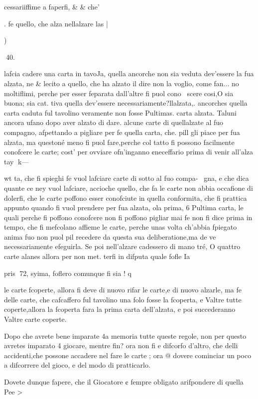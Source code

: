 \documentclass[11pt,a6paper]{article}
\begin{document}
 

cessariiffime a faperfi, & & che’

. fe quello, che alza nellalzare
las |

)

 
40.

lafcia cadere una carta in tavoJa, quella ancorche non sia veduta dev’essere la fua alzata, ne
& lecito a quello, che ha alzato
il dire non la voglio, come fan...
no moltiflimi, perche per esser
feparata dall’altre fi puol cono~
scere cosi,O sia buona; sia cat.
tiva quella dev’essere necessariamente?llalzata,. ancorches
quella carta caduta ful tavolino
veramente non fosse Pultimas.
carta alzata. Taluni ancora
ufano dopo aver alzato di dare.
alcune carte di quellalzate al
fuo compagno, afpettando a pigliare per fe quella carta, che.
pill gli piace per fua alzata, ma
questoné meno fi puol fare,perche col tatto fi possono facilmente conofcere le carte; cost’
per ovviare ofn’inganno ¢neceffario prima di venir all’alza
tay
k—

wt
ta, che fi spieghi fe vuol lafciare carte di sotto al fuo compa-~
gna, e che dica quante ce ney
vuol lafciare, accioche quello,
che fa le carte non abbia occafione di dolerfi, che le carte
poffono esser conofciute in quella conformita, che fi prattica
appunto quando fi vuol prendere per fua alzata, ola prima, 6
Pultima carta, le quali perche fi
poffono conofcere non fi poffono pigliar mai fe non fi dice prima in tempo, che fi mefcolano
affieme le carte, perche unas
volta ch’abbia fpiegato anima
fuo non puol pil recedere da
questa sua deliberatione,ma de
ve necessariamente efeguirla.
Se poi nell’alzare cadessero
di mano tré, O quattro carte
alanes allora per non met.
terfi in difputa quale fofle Ia

pris
72,
syima, foflero comunque fi sia
! q

le carte fcoperte, allora fi deve
di nuovo rifar le carte,e di nuovo alzarle, ma fe delle carte,
che cafcaffero ful tavolino una
folo fosse la fcoperta, e Valtre
tutte coperte,allora la fcoperta
fara la prima carta dell’alzata,
e poi succederanno Valtre carte
coperte.

Dopo che avrete bene imparate 4a memoria tutte queste regole, non per questo avretes
imparato 4 giocare, mentre fin?
ora non fi e difcorfo d’altro,
che delli accidenti,che possone
accadere nel fare le carte ; ora
@ dovere cominciar un poco a
difcorrere del gioco, e del modo di pratticarlo.

Dovete dunque fapere, che
il Giocatore ¢ fempre obligato
arifpondere di quella Pee >
\end{document}
